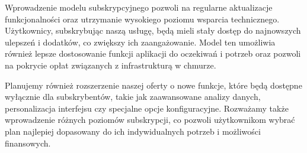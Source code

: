 Wprowadzenie modelu subskrypcyjnego pozwoli na regularne aktualizacje funkcjonalności oraz utrzymanie wysokiego poziomu wsparcia technicznego. Użytkownicy, subskrybując naszą usługę, będą mieli stały dostęp do najnowszych ulepszeń i dodatków, co zwiększy ich zaangażowanie. Model ten umożliwia również lepsze dostosowanie funkcji aplikacji do oczekiwań i potrzeb oraz pozwoli na pokrycie opłat związanych z infrastrukturą w chmurze.

Planujemy również rozszerzenie naszej oferty o nowe funkcje, które będą dostępne wyłącznie dla subskrybentów, takie jak zaawansowane analizy danych, personalizacja interfejsu czy specjalne opcje konfiguracyjne. Rozważamy także wprowadzenie różnych poziomów subskrypcji, co pozwoli użytkownikom wybrać plan najlepiej dopasowany do ich indywidualnych potrzeb i możliwości finansowych.